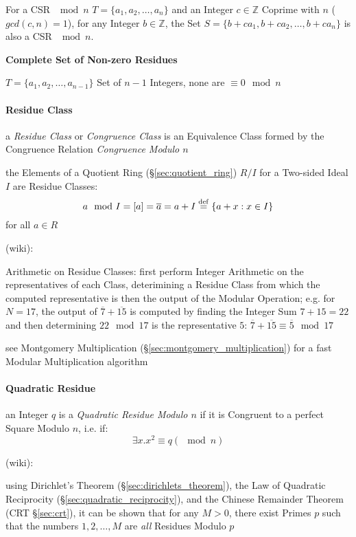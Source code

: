 For a CSR $\mod n$ $T = \{a_1, a_2, \ldots, a_n\}$ and an Integer $c \in
\mathbb{Z}$ Coprime with $n$ ($gcd(c,n) = 1$), for any Integer $b \in
\mathbb{Z}$, the Set $S = \{b + ca_1, b + ca_2, \ldots, b + ca_n \}$ is also a
CSR $\mod n$.



\textbf{Complete Set of Non-zero Residues}

$T = \{ a_1, a_2, \ldots, a_{n-1} \}$ Set of $n-1$ Integers, none are
$\equiv 0 \mod n$



\paragraph{Residue Class}\label{sec:residue_class}\hfill

a \emph{Residue Class} or \emph{Congruence Class} is an Equivalence Class formed
by the Congruence Relation \emph{Congruence Modulo $n$}

\fist the Elements of a Quotient Ring (\S\ref{sec:quotient_ring}) $R / I$ for a
Two-sided Ideal $I$ are Residue Classes:
\[
  a \mod I = [a] = \overline{a} = a + I \stackrel{\mathrm{def}}= \{ a + x : x \in I \}
\]
for all $a \in R$

(wiki):

Arithmetic on Residue Classes: first perform Integer Arithmetic on the
representatives of each Class, deterimining a Residue Class from which the
computed representative is then the output of the Modular Operation; e.g. for
$N = 17$, the output of $\overline{7} + \overline{15}$ is computed by finding
the Integer Sum $7 + 15 = 22$ and then determining $22 \mod 17$ is the
representative $5$:
$\overline{7} + \overline{15} \equiv \overline{5} \mod 17$

\fist see Montgomery Multiplication (\S\ref{sec:montgomery_multiplication}) for
a fast Modular Multiplication algorithm



\paragraph{Quadratic Residue}\label{sec:quadratic_residue}\hfill

an Integer $q$ is a \emph{Quadratic Residue Modulo $n$} if it is Congruent to
a perfect Square Modulo $n$, i.e. if:
\[
  \exists x . x^2 \equiv q (\mod n)
\]

(wiki):

using Dirichlet's Theorem (\S\ref{sec:dirichlets_theorem}), the Law of Quadratic
Reciprocity (\S\ref{sec:quadratic_reciprocity}), and the Chinese Remainder
Theorem (CRT \S\ref{sec:crt}), it can be shown that for any $M > 0$, there exist
Primes $p$ such that the numbers $1, 2, \ldots, M$ are \emph{all} Residues
Modulo $p$

